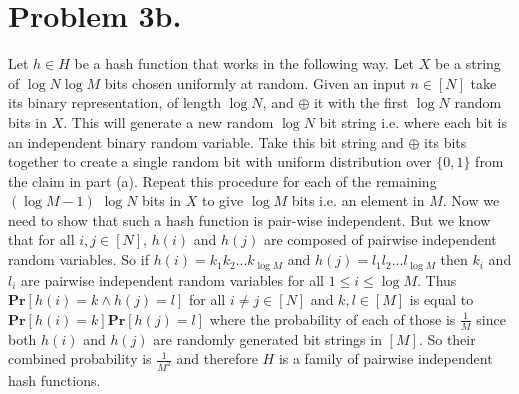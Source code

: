 \documentclass[12pt]{article}
\begin{document}
\section*{Problem 3b.} Let $h \in H$ be a hash function that works in the
following way. Let $X$ be a string of $\log N \log M$ bits chosen uniformly at
random. Given an input $n \in [N]$ take its binary representation, of length
$\log N$, and $\oplus$ it with the first $\log N$ random bits in $X$.
This will generate a new random $\log N$ bit string i.e. where each bit is an
independent binary random variable. Take this bit string and $\oplus$ its bits
together to create a single random bit with uniform distribution over
$\{0,1\}$ from the claim in part (a). Repeat this procedure for each of the
remaining $(\log M - 1)$ $\log N$ bits in $X$ to give $\log M$ bits i.e. an
element in $M$. Now we need to show that such a hash function is pair-wise
independent. But we know that for all $i,j \in [N]$, $h(i)$ and $h(j)$ are
composed of pairwise independent random variables. So if
$h(i) = k_1k_2...k_{\log M}$ and $h(j) = l_1l_2...l_{\log M}$ then $k_i$ and
$l_i$ are pairwise independent random variables for all $1 \le i \le \log M$.
Thus $\textbf{Pr}[h(i) = k \wedge h(j) = l]$ for all $i \neq j \in [N]$ and
$k,l \in [M]$ is equal to $\textbf{Pr}[h(i) = k]\textbf{Pr}[h(j) = l]$ where the
probability of each of those is $\frac{1}{M}$ since both $h(i)$ and $h(j)$
are randomly generated bit strings in $[M]$. So their combined probability is
$\frac{1}{M^2}$ and therefore $H$ is a family of pairwise independent hash
functions.
\end{document}
